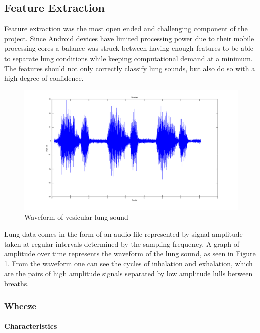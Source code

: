 \documentclass{article}
\begin{document}
\subsection{Feature Extraction}

Feature extraction was the most open ended and challenging  component of the project. Since Android devices have limited processing power due to their mobile processing cores a balance was struck between having enough features to be able to separate lung conditions while keeping computational demand at a minimum. The features should not only correctly classify lung sounds, but also do so with a high degree of confidence. \\

\begin{figure}[h!]
	\includegraphics[width=\linewidth]{images/VesicularWaveform.png}
	\caption{Waveform of vesicular lung sound}
 	\label{fig:VesicularWaveform}
\end{figure}

Lung data comes in the form of an audio file represented by signal amplitude taken at regular intervals determined by the sampling frequency. A graph of amplitude over time represents the waveform of the lung sound, as seen in Figure \ref{fig:VesicularWaveform}. From the waveform one can see the cycles of inhalation and exhalation, which are the pairs of high amplitude signals separated by low amplitude lulls between breaths. \\
\newpage
\subsubsection{Wheeze}

\paragraph{Characteristics}
\end{document}

